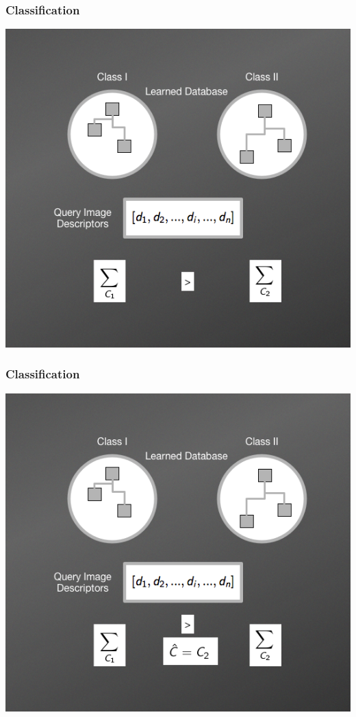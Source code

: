 \documentclass[aspectratio=169]{beamer}
\begin{document}
    \begin{frame}
        \frametitle{Classification}
        \begin{center}
            \item \includegraphics[scale=0.38]{images/NBNNMethod4.png}     
        \end{center}
    \end{frame}    
    
    \begin{frame}
        \frametitle{Classification}
        \begin{center}
            \item \includegraphics[scale=0.38]{images/NBNNMethod5.png}     
        \end{center}
    \end{frame}    
    
\end{document}
